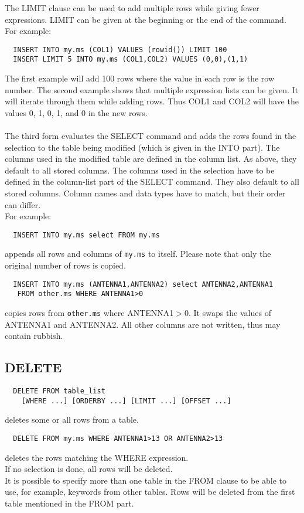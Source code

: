 The LIMIT clause can be used to add multiple rows while giving fewer
expressions. LIMIT can be given at the beginning or the end of the
command. For example:
\begin{verbatim}
  INSERT INTO my.ms (COL1) VALUES (rowid()) LIMIT 100
  INSERT LIMIT 5 INTO my.ms (COL1,COL2) VALUES (0,0),(1,1)
\end{verbatim}
The first example will add 100 rows where the value in each row is the
row number. The second example shows that multiple expression lists
can be given. It will iterate through them while adding rows. Thus
COL1 and COL2 will have the values 0, 1, 0, 1, and 0 in the new rows.

\paragraph*{}
The third form evaluates the SELECT command and adds the rows
found in the selection to the table being modified (which is given
in the INTO part).
The columns used in the modified table are defined in the column list.
As above, they default to all stored columns. The columns used in the
selection have to be defined in the column-list part of the SELECT command.
They also default to all stored columns.
Column names and data types have to match, but their order can differ.
\\For example:
\begin{verbatim}
  INSERT INTO my.ms select FROM my.ms
\end{verbatim}
appends all rows and columns of \texttt{my.ms} to itself.
Please note that only the original number of rows is copied.
\begin{verbatim}
  INSERT INTO my.ms (ANTENNA1,ANTENNA2) select ANTENNA2,ANTENNA1
   FROM other.ms WHERE ANTENNA1>0
\end{verbatim}
copies rows from \texttt{other.ms} where ANTENNA1$>$0. It swaps the
values of ANTENNA1 and ANTENNA2. All other columns are not written,
thus may contain rubbish.

\subsection{DELETE}
\begin{verbatim}
  DELETE FROM table_list
    [WHERE ...] [ORDERBY ...] [LIMIT ...] [OFFSET ...]
\end{verbatim}
deletes some or all rows from a table.
\begin{verbatim}
  DELETE FROM my.ms WHERE ANTENNA1>13 OR ANTENNA2>13
\end{verbatim}
deletes the rows matching the WHERE expression.
\\If no selection is done, all rows will be deleted.
\\It is possible to specify more than one table in the FROM clause to
be able to use, for example, keywords from other tables.
Rows will be deleted from the first table mentioned in the FROM part.

